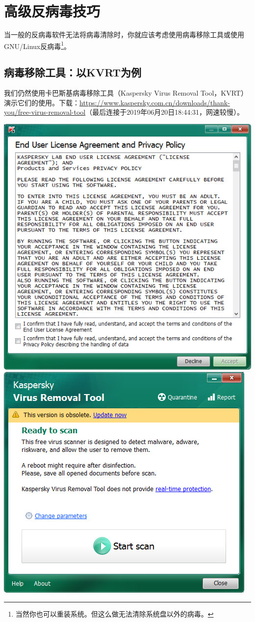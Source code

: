 \documentclass{book}
\begin{document}
\section{高级反病毒技巧}
当一般的反病毒软件无法将病毒清除时，你就应该考虑使用病毒移除工具或使用GNU/Linux反病毒\footnote{当然你也可以重装系统。但这么做无法清除系统盘以外的病毒。}。
\subsection{病毒移除工具：以KVRT为例}
我们仍然使用卡巴斯基病毒移除工具（Kaspersky Virus Removal Tool，KVRT）演示它们的使用。下载：\url{https://www.kaspersky.com.cn/downloads/thank-you/free-virus-removal-tool}（最后连接于2019年06月20日18:44:31，网速较慢）。
\begin{center}
	\includegraphics[scale=0.5]{pic/kvrt_eula.PNG}        \includegraphics[scale=0.6]{pic/kvrt_ready.PNG}\\

\end{center}
\end{document}
